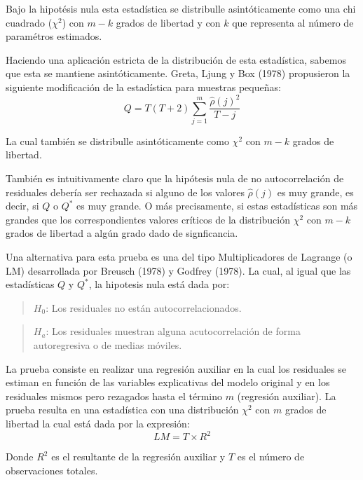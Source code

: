 \documentclass[
]{book}
\begin{document}
Bajo la hipotésis nula esta estadística se distribulle asintóticamente como una chi cuadrado (\(\chi^2\)) con \(m-k\) grados de libertad y con \(k\) que representa al número de paramétros estimados.

Haciendo una aplicación estricta de la distribución de esta estadística, sabemos que esta se mantiene asintóticamente. Greta, Ljung y Box (1978) propusieron la siguiente modificación de la estadística para muestras pequeñas:
\begin{equation}
    Q = T(T + 2) \sum_{j = 1}^{m} \frac{\hat{\rho} (j)^2}{T - j}
    \label{eq:eqautocorr3}
\end{equation}

La cual también se distribulle asintóticamente como \(\chi^2\) con \(m-k\) grados de libertad.

También es intuitivamente claro que la hipótesis nula de no autocorrelación de residuales debería ser rechazada si alguno de los valores \(\hat{\rho} (j)\) es muy grande, es decir, si \(Q\) o \(Q^*\) es muy grande. O más precisamente, si estas estadísticas son más grandes que los correspondientes valores críticos de la distribución \(\chi^2\) con \(m-k\) grados de libertad a algún grado dado de signficancia.

Una alternativa para esta prueba es una del tipo Multiplicadores de Lagrange (o LM) desarrollada por Breusch (1978) y Godfrey (1978). La cual, al igual que las estadísticas \(Q\) y \(Q^*\), la hipotesis nula está dada por:

\begin{quote}
\(H_0\): Los residuales no están autocorrelacionados.
\end{quote}

\begin{quote}
\(H_a\): Los residuales muestran alguna acutocorrelación de forma autoregresiva o de medias móviles.
\end{quote}

La prueba consiste en realizar una regresión auxiliar en la cual los residuales se estiman en función de las variables explicativas del modelo original y en los residuales mismos pero rezagados hasta el término \(m\) (regresión auxiliar). La prueba resulta en una estadística con una distribución \(\chi^2\) con \(m\) grados de libertad la cual está dada por la expresión:
\begin{equation}
    LM = T \times R^2
    \label{eq:eqautocorr4}
\end{equation}

Donde \(R^2\) es el resultante de la regresión auxiliar y \(T\) es el número de observaciones totales.
\end{document}
